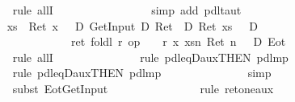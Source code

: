 \begin{isabellebody}
\ \ \ \ \ \ \ \ \ \ \ \ \ \ \isamarkupfalse%
rule\ allI{\isacharparenright}\ \isanewline
\ \ \ \ \ \ \ \ \ \ \ \ \ \ \isamarkupfalse%
\ {\isacharparenleft}simp\ add{\isacharcolon}\ pdl{\isacharunderscore}taut{\isacharparenright}\isanewline
\ \ \ \ \ \ \ \ \ \ \isamarkupfalse%
\isanewline
\ \ \ \ \ \ \ \ \ \ \ \ \isamarkupfalse%
\ {\isachardoublequote}{\isasymforall}xs{\isachardot}\ {\isasymturnstile}\ Ret\ {\isacharparenleft}x\ {\isacharequal}\ {}{\isacharparenright}\ {\isasymand}\isactrlsub D\ GetInput\ {\isacharequal}\isactrlsub D\ Ret\ {\isacharbrackleft}{\isacharbrackright}\ {\isasymand}\isactrlsub D\ Ret\ {\isacharparenleft}xs\ {\isacharequal}\ {\isacharbrackleft}{\isacharbrackright}{\isacharparenright}\ {\isasymlongrightarrow}\isactrlsub D\isanewline
\ \ \ \ \ \ \ \ \ \ \ \ \ \ \ \ \ \ \ \ \ \ \ \ \ {\isasymlangle}ret\ {\isacharparenleft}foldl\ {\isacharparenleft}{\isasymlambda}r{\isachardot}\ op\ {\isacharplus}\ {\isacharparenleft}{}{}\ {\isacharasterisk}\ r{\isacharparenright}{\isacharparenright}\ x\ xs{\isacharparenright}{\isasymrangle}{\isacharparenleft}{\isasymlambda}n{\isachardot}\ Ret\ {\isacharparenleft}n\ {\isacharequal}\ {}{\isacharparenright}\ {\isasymand}\isactrlsub D\ Eot{\isacharparenright}{\isachardoublequote}\isanewline
\ \ \ \ \ \ \ \ \ \ \ \ \ \ \isamarkupfalse%
rule\ allI{\isacharparenright}\isanewline
\ \ \ \ \ \ \ \ \ \ \ \ \ \ \isamarkupfalse%
rule\ pdl{\isacharunderscore}eqD{\isacharunderscore}aux{}{\isacharbrackleft}THEN\ pdl{\isacharunderscore}mp{\isacharbrackright}{\isacharparenright}\isanewline
\ \ \ \ \ \ \ \ \ \ \ \ \ \ \isamarkupfalse%
rule\ pdl{\isacharunderscore}eqD{\isacharunderscore}aux{}{\isacharbrackleft}THEN\ pdl{\isacharunderscore}mp{\isacharbrackright}{\isacharparenright}\isanewline
\ \ \ \ \ \ \ \ \ \ \ \ \ \ \isamarkupfalse%
simp{\isacharparenright}\isanewline
\ \ \ \ \ \ \ \ \ \ \ \ \ \ \isamarkupfalse%
subst\ Eot{\isacharunderscore}GetInput{\isacharparenright}\isanewline
\ \ \ \ \ \ \ \ \ \ \ \ \ \ \isamarkupfalse%
\ {\isacharparenleft}rule\ ret{\isacharunderscore}one{\isacharunderscore}aux{\isacharparenright}\isanewline
\ \ \ \ \ \ \ \ \ \ \isamarkupfalse%
\isanewline
\ \ \ \ \ \ \ \ \isamarkupfalse%
\isanewline
\ \ \ \ \ \ \ \ \isamarkupfalse%

\end{isabellebody}
